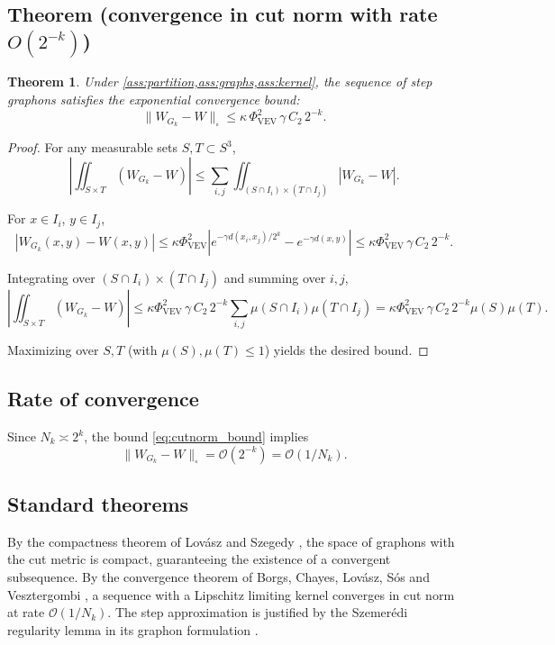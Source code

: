 \documentclass[12pt]{article}
\newtheorem{theorem}{Theorem}[section]
\numberwithin{equation}{section}
\newcommand{\VEV}{\Phi_{\mathrm{VEV}}}
\begin{document}
\subsection{Theorem (convergence in cut norm with rate \(O(2^{-k})\))}

\begin{theorem}\label{thm:cutnorm}
\leavevmode
Under \cref{ass:partition,ass:graphs,ass:kernel}, the sequence of step graphons satisfies the exponential convergence bound:
\begin{equation}\label{eq:cutnorm_bound}
\| W_{G_k} - W \|_{\square} \le \kappa \, \VEV^2 \, \gamma \, C_2 \, 2^{-k}.
\end{equation}
\end{theorem}
\begin{proof}
For any measurable sets \(S, T \subset S^3\),
\[
\left| \iint_{S \times T} (W_{G_k} - W) \right|
\le \sum_{i,j} \iint_{(S \cap I_i) \times (T \cap I_j)} |W_{G_k} - W|.
\]

For \(x \in I_i\), \(y \in I_j\),
\[
|W_{G_k}(x,y) - W(x,y)|
\le \kappa \VEV^2 \left| e^{-\gamma d(x_i,x_j)/2^k} - e^{-\gamma d(x,y)} \right|
\le \kappa \VEV^2 \, \gamma \, C_2 \, 2^{-k}.
\]

Integrating over \((S \cap I_i) \times (T \cap I_j)\) and summing over \(i,j\),
\[
\left| \iint_{S \times T} (W_{G_k} - W) \right|
\le \kappa \VEV^2 \, \gamma \, C_2 \, 2^{-k} \sum_{i,j} \mu(S \cap I_i) \mu(T \cap I_j)
= \kappa \VEV^2 \, \gamma \, C_2 \, 2^{-k} \mu(S) \mu(T).
\]

Maximizing over \(S, T\) (with \(\mu(S), \mu(T) \le 1\)) yields the desired bound.
\end{proof}

\subsection{Rate of convergence}

Since \(N_k \asymp 2^k\), the bound \eqref{eq:cutnorm_bound} implies
\[
\| W_{G_k} - W \|_{\square} = \mathcal{O}(2^{-k}) = \mathcal{O}(1/N_k). \tag{37}
\]

\subsection{Standard theorems}

By the compactness theorem of Lov{\'a}sz and Szegedy \cite{lovasz2006}, the space of graphons with the cut metric is compact, guaranteeing the existence of a convergent subsequence. By the convergence theorem of Borgs, Chayes, Lov{\'a}sz, S{\'o}s and Vesztergombi \cite{borgs2008}, a sequence with a Lipschitz limiting kernel converges in cut norm at rate \(\mathcal{O}(1/N_k)\). The step approximation is justified by the Szemerédi regularity lemma in its graphon formulation \cite{janson2021}.
\end{document}
